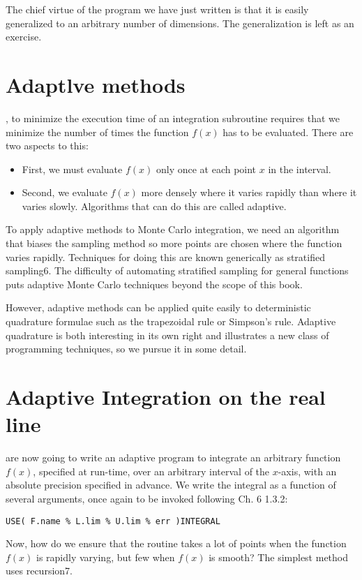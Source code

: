 The chief virtue of the program we have just written is that it is easily generalized to an arbitrary number of dimensions. The generalization is left as an exercise.

\section{Adaptlve methods}
, to minimize the execution time of an integration subroutine requires that we minimize the number of times the function $f(x)$ has to be evaluated. There are two aspects to this:
\begin{itemize}
    \item First, we must evaluate $f(x)$ only once at each point $x$ in the interval.
    \item Second, we evaluate $f(x)$ more densely where it varies rapidly than where it varies slowly. Algorithms that can do this are called adaptive.
\end{itemize}

To apply adaptive methods to Monte Carlo integration, we need an algorithm that biases the sampling method so more points are chosen where the function varies rapidly. Techniques for doing this are known generically as stratified sampling6. The difficulty of automating stratified sampling for general functions puts adaptive Monte Carlo techniques beyond the scope of this book.

However, adaptive methods can be applied quite easily to deterministic quadrature formulae such as the trapezoidal rule or Simpson’s rule. Adaptive quadrature is both interesting in its own right and illustrates a new class of programming techniques, so we pursue it in some detail.

\section{Adaptive Integration on the real line}
 are now going to write an adaptive program to integrate an arbitrary function $f(x)$, specified at run-time, over an arbitrary interval of the $x$-axis, with an absolute precision speciﬁed in advance. We write the integral as a function of several arguments, once again to be invoked following Ch. 6 1.3.2:

\begin{lstlisting}
USE( F.name % L.lim % U.lim % err )INTEGRAL
\end{lstlisting}

Now, how do we ensure that the routine takes a lot of points when the function $f(x)$ is rapidly varying, but few when $f(x)$ is smooth? The simplest method uses recursion7.

